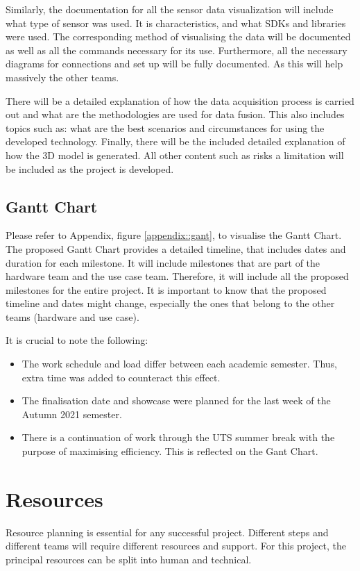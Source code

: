 \documentclass[12pt]{report}
\begin{document}
Similarly, the documentation for all the sensor data visualization will include what type of sensor was used. It is characteristics, and what SDKs and libraries were used. 
The corresponding method of visualising the data will be documented as well as all the commands necessary for its use. 
Furthermore, all the necessary diagrams for connections and set up will be fully documented. As this will help massively the other teams. 

There will be a detailed explanation of how the data acquisition process is carried out and what are the methodologies are used for data fusion. 
This also includes topics such as: what are the best scenarios and circumstances for using the developed technology. 
Finally, there will be the included detailed explanation of how the 3D model is generated. 
All other content such as risks a limitation will be included as the project is developed.

\subsection{Gantt Chart}
Please refer to Appendix, figure \ref{appendix::gant}, to visualise the Gantt Chart. The proposed Gantt Chart provides a detailed timeline, that includes dates and duration for each milestone. 
It will include milestones that are part of the hardware team and the use case team. Therefore, it will include all the proposed milestones for the entire project. 
It is important to know that the proposed timeline and dates might change, especially the ones that belong to the other teams (hardware and use case). 

It is crucial to note the following:
\begin{itemize}
  \item The work schedule and load differ between each academic semester. Thus, extra time was added to counteract this effect.
  \item The finalisation date and showcase were planned for the last week of the Autumn 2021 semester. 
  \item There is a continuation of work through the UTS summer break with the purpose of maximising efficiency. This is reflected on the Gant Chart.
\end{itemize}

\section{Resources}
Resource planning is essential for any successful project. 
Different steps and different teams will require different resources and support. For this project, the principal resources can be split into human and technical. 
\end{document}
